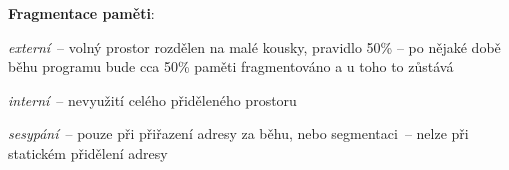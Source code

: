 \textbf{Fragmentace paměti}:
\begin{pitemize}
	\item \emph{externí}~-- volný prostor rozdělen na malé kousky, pravidlo 50\% -- po nějaké době běhu programu bude cca 50\% paměti fragmentováno a u toho to zůstává
	\item \emph{interní}~-- nevyužití celého přiděleného prostoru
	\item \emph{sesypání}~-- pouze při přiřazení adresy za běhu, nebo segmentaci~-- nelze při statickém přidělení adresy
\end{pitemize}
